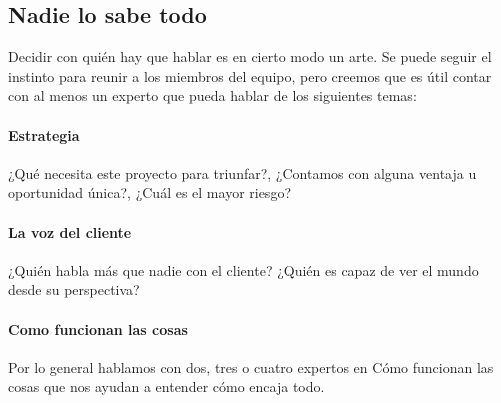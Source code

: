 \documentclass[10pt]{article}
\begin{document}
\begin{multicols}{2}
\subsection*{Nadie lo sabe todo}
Decidir con quién hay que hablar es en cierto modo un arte. Se puede seguir el instinto para reunir a los miembros del equipo, pero creemos que es útil contar con al menos un experto que pueda hablar de los siguientes temas:
\paragraph*{Estrategia}  ¿Qué necesita este proyecto para triunfar?, ¿Contamos con alguna ventaja u oportunidad única?, ¿Cuál es el mayor riesgo?
\paragraph*{La voz del cliente} ¿Quién habla más que nadie con el cliente? ¿Quién es capaz de ver el mundo desde su perspectiva?
\paragraph*{Como funcionan las cosas}
Por lo general hablamos con dos, tres o cuatro expertos en Cómo funcionan las cosas que nos ayudan a entender cómo encaja todo.

\end{multicols}
\end{document}
